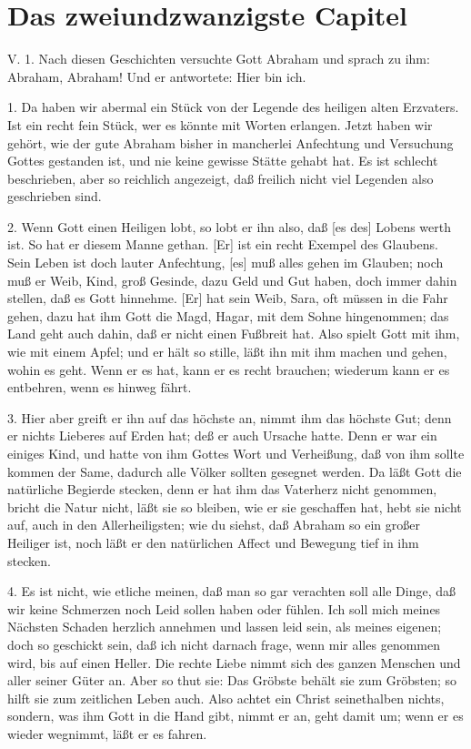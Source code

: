 \section{Das zweiundzwanzigste Capitel}

V. 1. Nach diesen Geschichten versuchte Gott Abraham und sprach zu ihm: Abraham, Abraham! Und er antwortete: Hier bin ich.

1. Da haben wir abermal ein Stück von der Legende des heiligen alten Erzvaters. Ist ein recht fein Stück, wer es könnte mit Worten erlangen. Jetzt haben wir gehört, wie der gute Abraham bisher in mancherlei Anfechtung und Versuchung Gottes gestanden ist, und nie keine gewisse Stätte gehabt hat. Es ist schlecht beschrieben, aber so reichlich angezeigt, daß freilich nicht viel Legenden also geschrieben sind.

2. Wenn Gott einen Heiligen lobt, so lobt er ihn also, daß [es des] Lobens werth ist. So hat er diesem Manne gethan. [Er] ist ein recht Exempel des Glaubens. Sein Leben ist doch lauter Anfechtung, [es] muß alles gehen im Glauben; noch muß er Weib, Kind, groß Gesinde, dazu Geld und Gut haben, doch immer dahin stellen, daß es Gott hinnehme. [Er] hat sein Weib, Sara, oft müssen in die Fahr gehen, dazu hat ihm Gott die Magd, Hagar, mit dem Sohne hingenommen; das Land geht auch dahin, daß er nicht einen Fußbreit hat. Also spielt Gott mit ihm, wie mit einem Apfel; und er hält so stille, läßt ihn mit ihm machen und gehen, wohin es geht. Wenn er es hat, kann er es recht brauchen; wiederum kann er es entbehren, wenn es hinweg fährt.

3. Hier aber greift er ihn auf das höchste an, nimmt ihm das höchste Gut; denn er nichts Lieberes auf Erden hat; deß er auch Ursache hatte. Denn er war ein einiges Kind, und hatte von ihm Gottes Wort und Verheißung, daß von ihm sollte kommen der Same, dadurch alle Völker sollten gesegnet werden. Da läßt Gott die natürliche Begierde stecken, denn er hat ihm das Vaterherz nicht genommen, bricht die Natur
nicht, läßt sie so bleiben, wie er sie geschaffen hat, hebt sie nicht auf, auch in den Allerheiligsten; wie du siehst, daß Abraham so ein großer Heiliger ist, noch läßt er den natürlichen Affect und Bewegung tief in ihm stecken.

4. Es ist nicht, wie etliche meinen, daß man so gar verachten soll alle Dinge, daß wir keine Schmerzen noch Leid sollen haben oder fühlen. Ich soll mich meines Nächsten Schaden herzlich annehmen und lassen leid sein, als meines eigenen; doch so geschickt sein, daß ich nicht darnach frage, wenn mir alles genommen wird, bis auf einen Heller. Die rechte Liebe nimmt sich des ganzen Menschen und aller seiner Güter an. Aber so thut sie: Das Gröbste behält sie zum Gröbsten; so hilft sie zum zeitlichen Leben auch. Also achtet ein Christ seinethalben nichts, sondern, was ihm Gott in die Hand gibt, nimmt er an, geht damit um; wenn er es wieder wegnimmt, läßt er es fahren.

